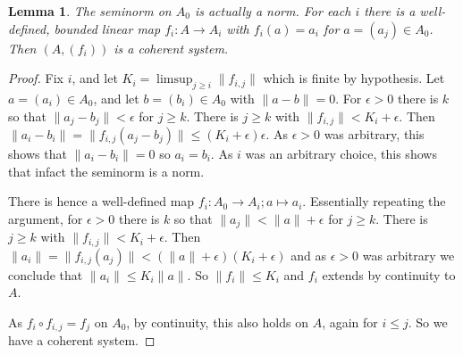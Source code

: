 \documentclass[a4paper,11pt]{article}
\newtheorem{lemma}{Lemma}[section]
\theoremstyle{definition}
\begin{document}
\begin{lemma}
The seminorm on $A_0$ is actually a norm.  For each $i$ there is a well-defined, bounded linear map $f_i \colon A \to A_i$ with $f_i(a) = a_i$ for $a=(a_j)\in A_0$.  Then $(A,(f_i))$ is a coherent system.
\end{lemma}
\begin{proof}
Fix $i$, and let $K_i = \limsup_{j\geq i} \|f_{i,j}\|$ which is finite by hypothesis.  Let $a=(a_i)\in A_0$, and let $b=(b_i)\in A_0$ with $\|a-b\|=0$.  For $\epsilon>0$ there is $k$ so that $\|a_j-b_j\|<\epsilon$ for $j\geq k$.  There is $j\geq k$ with $\|f_{i,j}\| < K_i+\epsilon$.  Then $\|a_i-b_i\| = \|f_{i,j}(a_j-b_j)\| \leq (K_i+\epsilon)\epsilon$.  As $\epsilon>0$ was arbitrary, this shows that $\|a_i-b_i\|=0$ so $a_i=b_i$.  As $i$ was an arbitrary choice, this shows that infact the seminorm is a norm.

There is hence a well-defined map $f_i \colon A_0 \to A_i; a\mapsto a_i$.  Essentially repeating the argument, for $\epsilon>0$ there is $k$ so that $\|a_j\| < \|a\|+\epsilon$ for $j\geq k$.  There is $j\geq k$ with $\|f_{i,j}\| < K_i+\epsilon$.  Then $\|a_i\| = \|f_{i,j}(a_j)\| < (\|a\|+\epsilon)(K_i+\epsilon)$ and as $\epsilon>0$ was arbitrary we conclude that $\|a_i\| \leq K_i \|a\|$.  So $\|f_i\| \leq K_i$ and $f_i$ extends by continuity to $A$.

As $f_i \circ f_{i,j} = f_j$ on $A_0$, by continuity, this also holds on $A$, again for $i\leq j$.  So we have a coherent system.
\end{proof}
\end{document}
